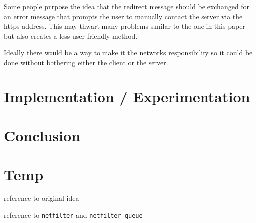 \documentclass{article}
\begin{document}
Some people purpose the idea that the redirect message should be exchanged for an error message that prompts the user to manually contact the server via the https address.  This may thwart many problems similar to the one in this paper but also creates a less user friendly method.

Ideally there would be a way to make it the networks responsibility so it could be done without bothering either the client or the server.  


\section{Implementation / Experimentation}

\section{Conclusion}

\section{Temp}

reference to original idea\cite{offpath}

reference to \texttt{netfilter}\cite{netfilter} and \texttt{netfilter\_queue}\cite{netfilterQueue}



\end{document}
